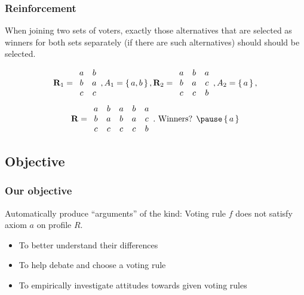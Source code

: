 \documentclass[french,english]{beamer}
\begin{document}
\begin{frame}
	\frametitle{Reinforcement}
	\begin{definition}[Reinforcement]
		When joining two sets of voters, exactly those alternatives that are selected as winners for both sets separately (if there are such alternatives) should should be selected.
	\end{definition}
	\begin{example}
		\begin{equation}
			\mathbf{R}_1 =
			\begin{array}{cc}
				a&b\\
				b&a\\
				c&c\\
			\end{array},
			A_1 = \set{a, b},
			\mathbf{R}_2 =
			\begin{array}{ccc}
				a&b&a\\
				b&a&c\\
				c&c&b\\
			\end{array},
			A_2 = \set{a},
		\end{equation}
		\begin{equation}
			\prof =
			\begin{array}{ccccc}
				a&b&a&b&a\\
				b&a&b&a&c\\
				c&c&c&c&b\\
			\end{array}.
			\text{ Winners? }
			\pause
			\set{a}
		\end{equation}
	\end{example}
\end{frame}

\subsection{Objective}
\begin{frame}
	\frametitle{Our objective}
	Automatically produce “arguments” of the kind: Voting rule $f$ does not satisfy axiom $a$ on profile $R$.
	\begin{itemize}
		\item To better understand their differences
		\item To help debate and choose a voting rule
		\item To empirically investigate attitudes towards given voting rules
	\end{itemize}
\end{frame}
\end{document}
